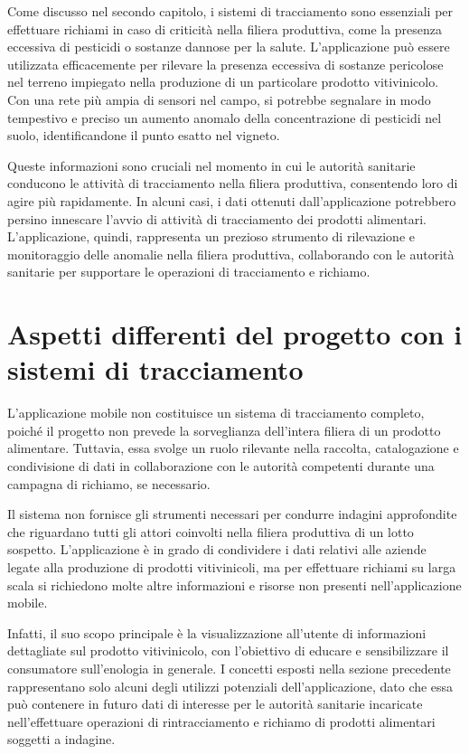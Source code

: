 Come discusso nel secondo capitolo, i sistemi di tracciamento sono essenziali per effettuare richiami in caso di criticità nella filiera produttiva, come la presenza eccessiva di pesticidi o sostanze dannose per la salute. L'applicazione può essere utilizzata efficacemente per rilevare la presenza eccessiva di sostanze pericolose nel terreno impiegato nella produzione di un particolare prodotto vitivinicolo. Con una rete più ampia di sensori nel campo, si potrebbe segnalare in modo tempestivo e preciso un aumento anomalo della concentrazione di pesticidi nel suolo, identificandone il punto esatto nel vigneto.

Queste informazioni sono cruciali nel momento in cui le autorità sanitarie conducono le attività di tracciamento nella filiera produttiva, consentendo loro di agire più rapidamente. In alcuni casi, i dati ottenuti dall'applicazione potrebbero persino innescare l'avvio di attività di tracciamento dei prodotti alimentari. L'applicazione, quindi, rappresenta un prezioso strumento di rilevazione e monitoraggio delle anomalie nella filiera produttiva, collaborando con le autorità sanitarie per supportare le operazioni di tracciamento e richiamo.

\section{Aspetti differenti del progetto con i sistemi di tracciamento}

L'applicazione mobile non costituisce un sistema di tracciamento completo, poiché il progetto non prevede la sorveglianza dell'intera filiera di un prodotto alimentare. Tuttavia, essa svolge un ruolo rilevante nella raccolta, catalogazione e condivisione di dati in collaborazione con le autorità competenti durante una campagna di richiamo, se necessario. 

Il sistema non fornisce gli strumenti necessari per condurre indagini approfondite che riguardano tutti gli attori coinvolti nella filiera produttiva di un lotto sospetto. L'applicazione è in grado di condividere i dati relativi alle aziende legate alla produzione di prodotti vitivinicoli, ma per effettuare richiami su larga scala si richiedono molte altre informazioni e risorse non presenti nell'applicazione mobile.

Infatti, il suo scopo principale è la visualizzazione all'utente di informazioni dettagliate sul prodotto vitivinicolo, con l'obiettivo di educare e sensibilizzare il consumatore sull'enologia in generale. I concetti esposti nella sezione precedente rappresentano solo alcuni degli utilizzi potenziali dell'applicazione, dato che essa può contenere in futuro dati di interesse per le autorità sanitarie incaricate nell'effettuare operazioni di rintracciamento e richiamo di prodotti alimentari soggetti a indagine.


